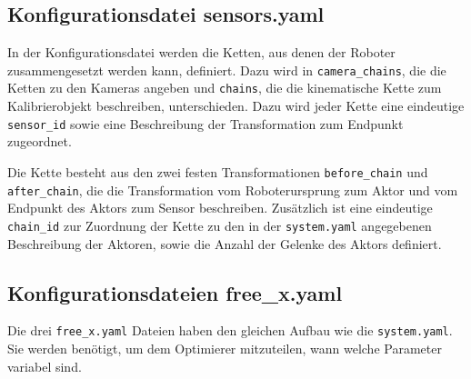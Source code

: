   \subsection{Konfigurationsdatei sensors.yaml} In der Konfigurationsdatei werden die Ketten, aus
    denen der Roboter zusammengesetzt werden kann, definiert. Dazu wird in
    \texttt{camera\_chains}, die die Ketten zu den Kameras angeben und 
    \texttt{chains}, die die kinematische Kette zum Kalibrierobjekt beschreiben,
    unterschieden.
    Dazu wird jeder Kette eine eindeutige \texttt{sensor\_id} sowie eine
    Beschreibung der Transformation zum Endpunkt zugeordnet.
    
    Die Kette besteht aus den zwei festen Transformationen \texttt{before\_chain}
    und \texttt{after\_\allowbreak chain}, die die Transformation vom Roboterursprung zum 
    Aktor und vom Endpunkt des Aktors zum Sensor beschreiben. Zusätzlich ist 
    eine eindeutige \texttt{chain\_id} zur Zuordnung der Kette zu den in der 
    \texttt{system.yaml} angegebenen Beschreibung der Aktoren, sowie die Anzahl
    der Gelenke des Aktors definiert.

  \subsection{Konfigurationsdateien free\_x.yaml} Die drei \texttt{free\_x.yaml} Dateien haben den 
    gleichen Aufbau wie die \texttt{system.yaml}. Sie werden benötigt, um dem 
    Optimierer mitzuteilen, wann welche Parameter variabel sind.










%

